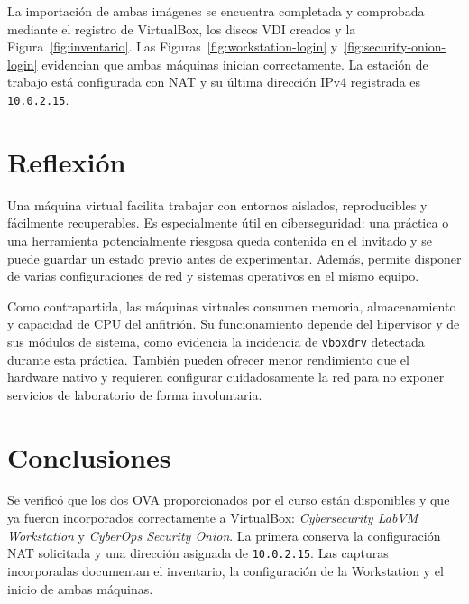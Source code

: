 \documentclass[11pt,a4paper]{article}
\begin{document}
La importación de ambas imágenes se encuentra completada y comprobada mediante
el registro de VirtualBox, los discos VDI creados y la Figura~\ref{fig:inventario}.
Las Figuras~\ref{fig:workstation-login} y~\ref{fig:security-onion-login}
evidencian que ambas máquinas inician correctamente. La estación de trabajo
está configurada con NAT y su última dirección IPv4 registrada es
\texttt{10.0.2.15}.

\section{Reflexión}

Una máquina virtual facilita trabajar con entornos aislados, reproducibles y
fácilmente recuperables. Es especialmente útil en ciberseguridad: una práctica
o una herramienta potencialmente riesgosa queda contenida en el invitado y se
puede guardar un estado previo antes de experimentar. Además, permite disponer
de varias configuraciones de red y sistemas operativos en el mismo equipo.

Como contrapartida, las máquinas virtuales consumen memoria, almacenamiento y
capacidad de CPU del anfitrión. Su funcionamiento depende del hipervisor y de
sus módulos de sistema, como evidencia la incidencia de \texttt{vboxdrv}
detectada durante esta práctica. También pueden ofrecer menor rendimiento que
el hardware nativo y requieren configurar cuidadosamente la red para no
exponer servicios de laboratorio de forma involuntaria.

\section{Conclusiones}

Se verificó que los dos OVA proporcionados por el curso están disponibles y
que ya fueron incorporados correctamente a VirtualBox: \emph{Cybersecurity
LabVM Workstation} y \emph{CyberOps Security Onion}. La primera conserva la
configuración NAT solicitada y una dirección asignada de \texttt{10.0.2.15}.
Las capturas incorporadas documentan el inventario, la configuración de la
Workstation y el inicio de ambas máquinas. 
\end{document}
